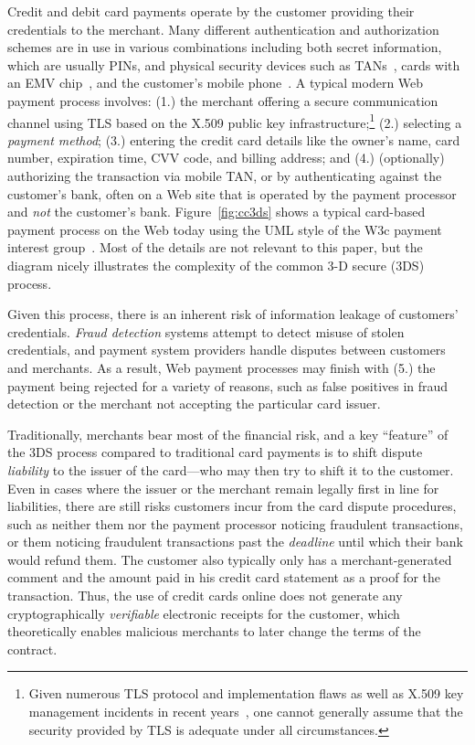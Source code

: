 \documentclass{llncs}
\begin{document}
Credit and debit card payments operate by the customer providing their
credentials to the merchant.  Many different authentication and
authorization schemes are in use in various combinations including
both secret information, which are usually PINs, and physical security
devices such as TANs~\cite{kobil2016tan}, cards with an EMV
chip~\cite{emv}, and the customer's mobile phone~\cite{mtan}.  A
typical modern Web payment process involves: {(1.)} the merchant
offering a secure communication channel using TLS based on the X.509
public key infrastructure;\footnote{Given numerous TLS protocol and
  implementation flaws as well as X.509 key management incidents in
  recent years~\cite{holz2014}, one cannot generally assume that the
  security provided by TLS is adequate under all circumstances.}
{(2.)} selecting a {\em payment method}; {(3.)} entering the credit
card details like the owner's name, card number, expiration time, CVV
code, and billing address; and {(4.)} (optionally) authorizing the
transaction via mobile TAN, or by authenticating against the
customer's bank, often on a Web site that is operated by the payment
processor and {\em not} the customer's bank.  Figure~\ref{fig:cc3ds}
shows a typical card-based payment process on the Web today using the
UML style of the W3c payment interest group~\cite{pigs}.  Most of the details
are not relevant to this paper, but the diagram nicely illustrates the
complexity of the common 3-D secure (3DS) process.

Given this process, there is an inherent risk of information leakage
of customers' credentials.  {\em Fraud detection} systems attempt to detect
misuse of stolen credentials, and payment system providers handle
disputes between customers and merchants.  As a result, Web payment
processes may finish with {(5.)} the payment being rejected for a
variety of reasons, such as false positives in fraud detection or
the merchant not accepting the particular card issuer.

Traditionally, merchants bear most of the financial risk, and a key
``feature'' of the 3DS process compared to traditional card payments
is to shift dispute {\em liability} to the issuer of the card---who
may then try to shift it to the customer.
%
%
Even in cases where the issuer or the merchant remain legally first in
line for liabilities, there are still risks customers incur from the
card dispute procedures, such as neither them nor the payment
processor noticing fraudulent transactions, or them noticing
fraudulent transactions past the {\em deadline} until which their bank
would refund them.  The customer also typically only has a
merchant-generated comment and the amount paid in his credit card
statement as a proof for the transaction.  Thus, the use of credit
cards online does not generate any cryptographically {\em verifiable}
electronic receipts for the customer, which theoretically enables
malicious merchants to later change the terms of the contract.
\end{document}
